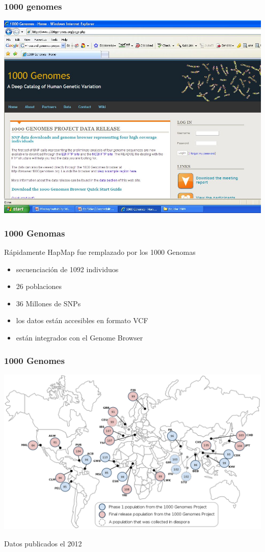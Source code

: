 \documentclass{beamer}\usepackage[]{graphicx}\usepackage[]{color}
\begin{document}
\begin{frame}[fragile]
\frametitle{1000 genomes}

\begin{center}
\includegraphics[width=0.7\linewidth]{1kG.jpg}
\end{center}
\end{frame}


\begin{frame}[fragile]
\frametitle{1000 Genomas}

R\'apidamente HapMap fue remplazado por los 1000 Genomas
\begin{itemize}
\item     secuenciaci\'on de 1092 individuos
\item     26 poblaciones 
\item     36 Millones de SNPs 
\item     los datos est\'an accesibles en formato VCF 
\item     est\'an integrados con el Genome Browser 
\end{itemize}

\end{frame}


\begin{frame}[fragile]
\frametitle{1000 Genomes}

\begin{center}
\includegraphics[width=0.7\linewidth]{1000_Genomes.png}
\end{center}
Datos publicados el 2012
\end{frame}
\end{document}
